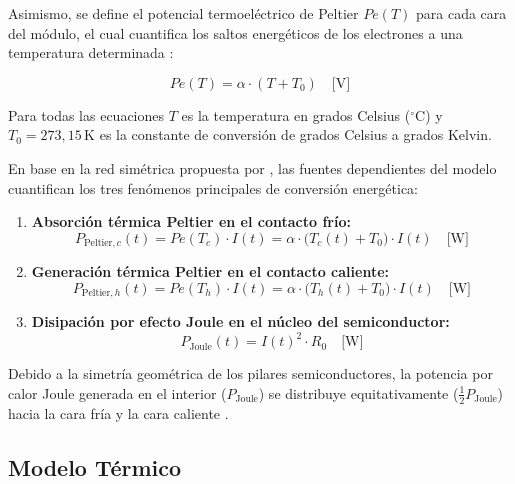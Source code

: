 \documentclass[12pt, a4paper]{article}
\begin{document}
Asimismo, se define el potencial termoeléctrico de Peltier $Pe(T)$ para cada cara del módulo, el cual cuantifica los saltos energéticos de los electrones a una temperatura determinada \parencite{Kubov_2016}:

\begin{equation}
    Pe(T) = \alpha \cdot (T + T_0) \quad \text{[V]}
    \label{eq:peltier_pot}
\end{equation}

Para todas las ecuaciones $T$ es la temperatura en grados Celsius ($^\circ\text{C}$) y $T_0 = 273{,}15\,\text{K}$ es la constante de conversión de grados Celsius a grados Kelvin.

En base en la red simétrica propuesta por \textcite{Kubov_2016}, las fuentes dependientes del modelo cuantifican los tres fenómenos principales de conversión energética:

\begin{enumerate}
    \item \textbf{Absorción térmica Peltier en el contacto frío:}
    \begin{equation}
        P_{\text{Peltier}, c}(t) = Pe(T_c) \cdot I(t) = \alpha \cdot \big(T_c(t) + T_0\big) \cdot I(t) \quad \text{[W]}
        \label{eq:p_peltier_c}
    \end{equation}
    
    \item \textbf{Generación térmica Peltier en el contacto caliente:}
    \begin{equation}
        P_{\text{Peltier}, h}(t) = Pe(T_h) \cdot I(t) = \alpha \cdot \big(T_h(t) + T_0\big) \cdot I(t) \quad \text{[W]}
        \label{eq:p_peltier_h}
    \end{equation}
    
    \item \textbf{Disipación por efecto Joule en el núcleo del semiconductor:}
    \begin{equation}
        P_{\text{Joule}}(t) = I(t)^2 \cdot R_0 \quad \text{[W]}
        \label{eq:p_joule}
    \end{equation}
\end{enumerate}

Debido a la simetría geométrica de los pilares semiconductores, la potencia por calor Joule generada en el interior ($P_{\text{Joule}}$) se distribuye equitativamente ($\frac{1}{2} P_{\text{Joule}}$) hacia la cara fría y la cara caliente \parencite{Kubov_2016}.


\subsection{Modelo Térmico}
\end{document}
